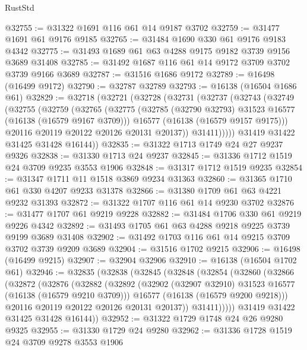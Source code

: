 \begin{lexlean}{RustStd}
\begin{coremodule}
@32755 := @31322 @1691 @116 @61 @14 @9187 @3702
@32759 := @31477 @1691 @61 @9176 @9185
@32765 := @31484 @1690 @330 @61 @9176 @9183 @4342
@32775 := @31493 @1689 @61 @63 @4288 @9175 @9182 @3739 @9156 @3689 @31408
@32785 := @31492 @1687 @116 @61 @14 @9172 @3709 @3702 @3739 @9166 @3689
@32787 := @31516 @1686 @9172
@32789 := @16498 (@16499 @9172)
@32790 := @32787 @32789
@32793 := @16138 (@16504 @1686 @61)
@32829 := @32718
    (@32721
      (@32728
        (@32731
          (@32737
            (@32743
              (@32749
                (@32755
                  (@32759
                    (@32765
                      (@32775
                        (@32785 (@32790 @32793) @31523 @16577 (@16138 (@16579 @9167 @3709)))
                        @16577
                        (@16138 (@16579 @9157 @9175)))
                      @20116
                      @20119
                      @20122
                      @20126
                      @20131
                      @20137))
                  @31411)))))
        @31419
        @31422
        @31425
        @31428
        @16144))
@32835 := @31322 @1713 @1749 @24 @27 @9237 @9326
@32838 := @31330 @1713 @24 @9237
@32845 := @31336 @1712 @1519 @24 @3709 @9235 @3553 @1906
@32848 := @31317 @1712 @1519 @9235
@32854 := @31347 @1711 @11 @1518 @3869 @9234 @31363
@32860 := @31365 @1710 @61 @330 @4207 @9233 @31378
@32866 := @31380 @1709 @61 @63 @4221 @9232 @31393
@32872 := @31322 @1707 @116 @61 @14 @9230 @3702
@32876 := @31477 @1707 @61 @9219 @9228
@32882 := @31484 @1706 @330 @61 @9219 @9226 @4342
@32892 := @31493 @1705 @61 @63 @4288 @9218 @9225 @3739 @9199 @3689 @31408
@32902 := @31492 @1703 @116 @61 @14 @9215 @3709 @3702 @3739 @9209 @3689
@32904 := @31516 @1702 @9215
@32906 := @16498 (@16499 @9215)
@32907 := @32904 @32906
@32910 := @16138 (@16504 @1702 @61)
@32946 := @32835
    (@32838
      (@32845
        (@32848
          (@32854
            (@32860
              (@32866
                (@32872
                  (@32876
                    (@32882
                      (@32892
                        (@32902 (@32907 @32910) @31523 @16577 (@16138 (@16579 @9210 @3709)))
                        @16577
                        (@16138 (@16579 @9200 @9218)))
                      @20116
                      @20119
                      @20122
                      @20126
                      @20131
                      @20137))
                  @31411)))))
        @31419
        @31422
        @31425
        @31428
        @16144))
@32952 := @31322 @1729 @1748 @24 @26 @9280 @9325
@32955 := @31330 @1729 @24 @9280
@32962 := @31336 @1728 @1519 @24 @3709 @9278 @3553 @1906

\end{coremodule}
\end{lexlean}
